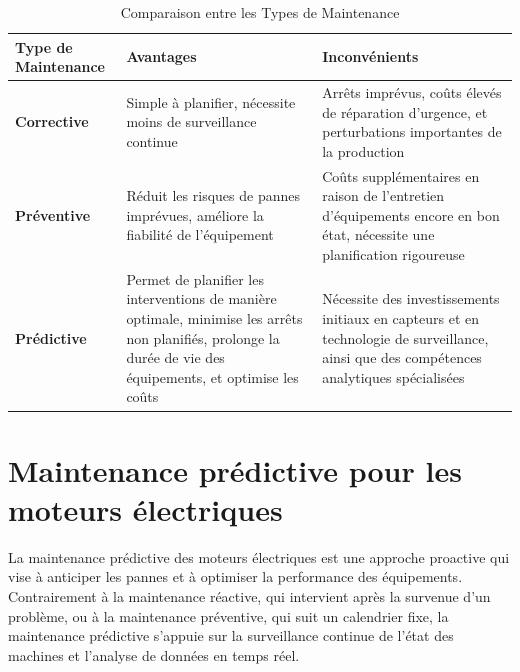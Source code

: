 \begin{table}[h]
	\centering
	\begin{tabular}{|l|p{5cm}|p{5cm}|}
		\hline
		\textbf{Type de Maintenance} & \textbf{Avantages}                                                                                                                                            & \textbf{Inconvénients}                                                                                                                   \\
		\hline
		\textbf{Corrective}          & Simple à planifier, nécessite moins de surveillance continue                                                                                                  & Arrêts imprévus, coûts élevés de réparation d’urgence, et perturbations importantes de la production                                     \\
		\hline
		\textbf{Préventive}          & Réduit les risques de pannes imprévues, améliore la fiabilité de l’équipement                                                                                 & Coûts supplémentaires en raison de l’entretien d’équipements encore en bon état, nécessite une planification rigoureuse                  \\
		\hline
		\textbf{Prédictive}          & Permet de planifier les interventions de manière optimale, minimise les arrêts non planifiés, prolonge la durée de vie des équipements, et optimise les coûts & Nécessite des investissements initiaux en capteurs et en technologie de surveillance, ainsi que des compétences analytiques spécialisées \\
		\hline
	\end{tabular}
	\caption{Comparaison entre les Types de Maintenance}
	\label{tab:comparaison-maintenance}
\end{table}

\section{Maintenance prédictive pour les  moteurs électriques }

La maintenance prédictive des moteurs électriques est une approche proactive
qui vise à anticiper les pannes et à optimiser la performance des équipements.
Contrairement à la maintenance réactive, qui intervient après la survenue d'un
problème, ou à la maintenance préventive, qui suit un calendrier fixe, la
maintenance prédictive s'appuie sur la surveillance continue de l'état des
machines et l'analyse de données en temps réel.


